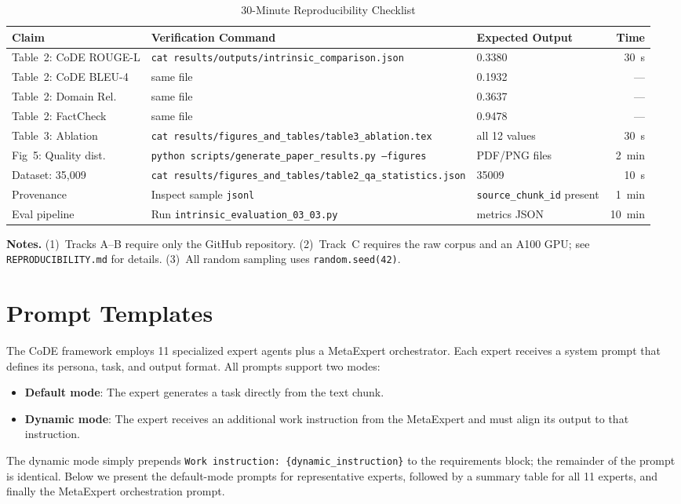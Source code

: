 \documentclass[sigconf,nonacm]{acmart}
\begin{document}
\begin{table}[h]
\centering
\caption{30-Minute Reproducibility Checklist}
\label{tab:reproducibility}
\small
\begin{tabular}{@{}p{3.5cm}p{5.2cm}p{2.5cm}r@{}}
\toprule
\textbf{Claim} & \textbf{Verification Command} & \textbf{Expected Output} & \textbf{Time} \\
\midrule
Table~2: CoDE ROUGE-L & \texttt{cat results/outputs/intrinsic\_comparison.json} & 0.3380 & 30~s \\
Table~2: CoDE BLEU-4 & same file & 0.1932 & --- \\
Table~2: Domain Rel. & same file & 0.3637 & --- \\
Table~2: FactCheck & same file & 0.9478 & --- \\
Table~3: Ablation & \texttt{cat results/figures\_and\_tables/table3\_ablation.tex} & all 12 values & 30~s \\
Fig~5: Quality dist. & \texttt{python scripts/generate\_paper\_results.py --figures} & PDF/PNG files & 2~min \\
Dataset: 35,009 & \texttt{cat results/figures\_and\_tables/table2\_qa\_statistics.json} & 35009 & 10~s \\
Provenance & Inspect sample \texttt{jsonl} & \texttt{source\_chunk\_id} present & 1~min \\
Eval pipeline & Run \texttt{intrinsic\_evaluation\_03\_03.py} & metrics JSON & 10~min \\
\bottomrule
\end{tabular}
\end{table}

\noindent\textbf{Notes.} (1)~Tracks A--B require only the GitHub repository. (2)~Track~C requires the raw corpus and an A100 GPU; see \texttt{REPRODUCIBILITY.md} for details. (3)~All random sampling uses \texttt{random.seed(42)}.

\section{Prompt Templates}

The CoDE framework employs 11 specialized expert agents plus a MetaExpert orchestrator. Each expert receives a system prompt that defines its persona, task, and output format. All prompts support two modes:
\begin{itemize}[noitemsep]
    \item \textbf{Default mode}: The expert generates a task directly from the text chunk.
    \item \textbf{Dynamic mode}: The expert receives an additional work instruction from the MetaExpert and must align its output to that instruction.
\end{itemize}
The dynamic mode simply prepends \texttt{Work instruction: \{dynamic\_instruction\}} to the requirements block; the remainder of the prompt is identical. Below we present the default-mode prompts for representative experts, followed by a summary table for all 11 experts, and finally the MetaExpert orchestration prompt.
\end{document}
